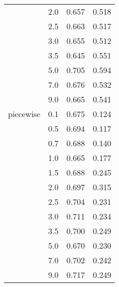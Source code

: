 \begin{tabular}{llrr}
          & 2.0 &               0.657 &                0.518 \\
          & 2.5 &               0.663 &                0.517 \\
          & 3.0 &               0.655 &                0.512 \\
          & 3.5 &               0.645 &                0.551 \\
          & 5.0 &               0.705 &                0.594 \\
          & 7.0 &               0.676 &                0.532 \\
          & 9.0 &               0.665 &                0.541 \\
piecewise & 0.1 &               0.675 &                0.124 \\
          & 0.5 &               0.694 &                0.117 \\
          & 0.7 &               0.688 &                0.140 \\
          & 1.0 &               0.665 &                0.177 \\
          & 1.5 &               0.688 &                0.245 \\
          & 2.0 &               0.697 &                0.315 \\
          & 2.5 &               0.704 &                0.231 \\
          & 3.0 &               0.711 &                0.234 \\
          & 3.5 &               0.700 &                0.249 \\
          & 5.0 &               0.670 &                0.230 \\
          & 7.0 &               0.702 &                0.242 \\
          & 9.0 &               0.717 &                0.249 \\
\bottomrule
\end{tabular}
